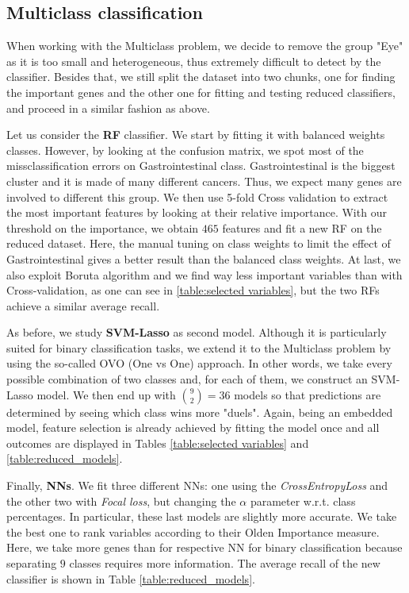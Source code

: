 \documentclass[a4paper,11pt, oneside]{article}  %
\begin{document}
\subsection{Multiclass classification}
When working with the Multiclass problem, we decide to remove the group "Eye" as it is too small and heterogeneous, thus extremely difficult to detect by the classifier. %
Besides that, we still split the dataset into two chunks, one for finding the important genes and the other one for fitting and testing reduced classifiers,  and proceed in a similar fashion as above.

Let us consider the \textbf{RF}  classifier. We start by fitting it with balanced weights classes. However, by looking at the confusion matrix, we spot most of the missclassification errors on Gastrointestinal class. Gastrointestinal is the biggest cluster and it is made of many different cancers. Thus, we expect many genes are involved to different this group. We then use 5-fold Cross validation to extract the most important features by looking at their relative importance. With our threshold on the importance, we obtain $465$ features and fit a new RF on the reduced dataset. Here, the manual tuning on class weights to limit the effect of Gastrointestinal gives a better result than the balanced class weights. At last, we also exploit Boruta algorithm and we find way less important variables than with Cross-validation, as one can see in \ref{table:selected variables}, but the two RFs achieve a similar average recall.

As before, we study \textbf{SVM-Lasso} as second model.  Although it is particularly suited for binary classification tasks, we extend it to the Multiclass problem by using the so-called OVO (One vs One) approach. In other words, we take every possible combination of two classes and, for each of them, we construct an SVM-Lasso model. We then end up with $ \binom{9}{2} = 36$ models so that predictions are determined by seeing which class wins more "duels". Again,  being an embedded model, feature selection is already achieved by fitting the model once and all outcomes are displayed in Tables \ref{table:selected variables} and \ref{table:reduced_models}.

Finally, \textbf{NNs}. We fit three different NNs: one using the \textit{CrossEntropyLoss} and the other two with \textit{Focal loss}, but changing the $\alpha$ parameter w.r.t. class percentages. In particular, these last models are slightly more accurate. We take the best one to rank variables according to their Olden Importance measure. Here, we take more genes than for respective NN for binary classification because separating $9$ classes requires more information. The average recall of the new classifier is shown in Table \ref*{table:reduced_models}.
\end{document}
